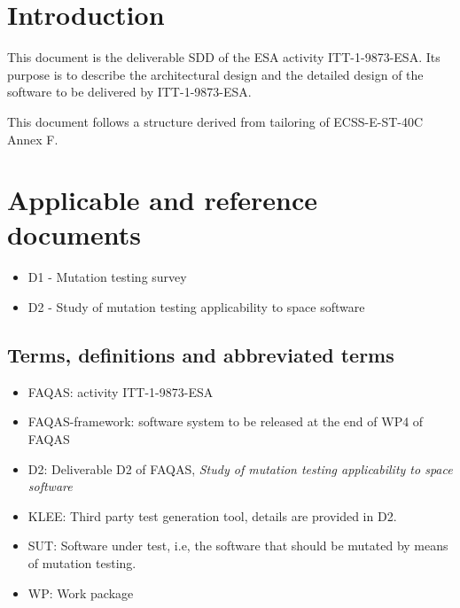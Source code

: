 
\chapter{Introduction}

This document is the deliverable SDD of the ESA activity ITT-1-9873-ESA. Its purpose is to describe the architectural design and the detailed design of the software to be delivered by ITT-1-9873-ESA. 

This document follows a structure derived from tailoring of ECSS-E-ST-40C Annex F.



\chapter{Applicable and reference documents}

\begin{itemize}
\item{D1 - Mutation testing survey}
\item{D2 - Study of mutation testing applicability to space software}
\end{itemize}

\section{Terms, definitions and abbreviated terms}

\begin{itemize}
\item{FAQAS}: activity ITT-1-9873-ESA
\item{FAQAS-framework}: software system to be released at the end of WP4 of FAQAS
\item{D2}: Deliverable D2 of FAQAS, \emph{Study of mutation testing applicability to space software}
\item{KLEE}: Third party test generation tool, details are provided in D2.
\item{SUT}: Software under test, i.e, the software that should be mutated by means of mutation testing.
\item{WP}: Work package
\end{itemize}


